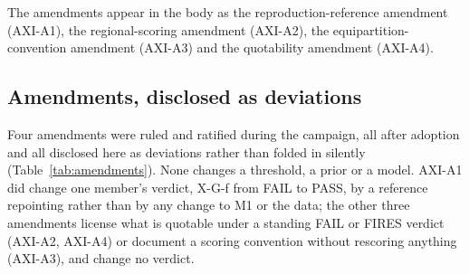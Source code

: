 \documentclass[11pt]{article}
\begin{document}
The amendments appear in the body as the reproduction-reference amendment (AXI-A1), the regional-scoring amendment (AXI-A2), the equipartition-convention amendment (AXI-A3) and the quotability amendment (AXI-A4).

\subsection{Amendments, disclosed as deviations}
\label{sec:deviations}

Four amendments were ruled and ratified during the campaign, all after adoption and all disclosed here as deviations rather than folded in silently (Table~\ref{tab:amendments}). None changes a threshold, a prior or a model. AXI-A1 did change one member's verdict, X-G-f from FAIL to PASS, by a reference repointing rather than by any change to M1 or the data; the other three amendments license what is quotable under a standing FAIL or FIRES verdict (AXI-A2, AXI-A4) or document a scoring convention without rescoring anything (AXI-A3), and change no verdict.
\end{document}
